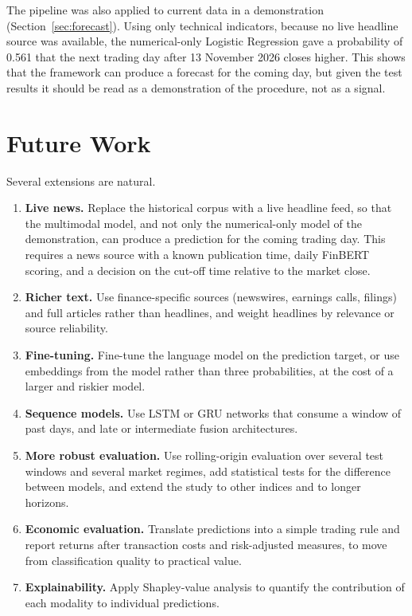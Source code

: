 The pipeline was also applied to current data in a demonstration (Section~\ref{sec:forecast}). Using only technical indicators, because no live headline source was available, the numerical-only Logistic Regression gave a probability of 0.561 that the next trading day after 13 November 2026 closes higher. This shows that the framework can produce a forecast for the coming day, but given the test results it should be read as a demonstration of the procedure, not as a signal.

\section{Future Work}
Several extensions are natural.
\begin{enumerate}
  \item \textbf{Live news.} Replace the historical corpus with a live headline feed, so that the multimodal model, and not only the numerical-only model of the demonstration, can produce a prediction for the coming trading day. This requires a news source with a known publication time, daily FinBERT scoring, and a decision on the cut-off time relative to the market close.
  \item \textbf{Richer text.} Use finance-specific sources (newswires, earnings calls, filings) and full articles rather than headlines, and weight headlines by relevance or source reliability.
  \item \textbf{Fine-tuning.} Fine-tune the language model on the prediction target, or use embeddings from the model rather than three probabilities, at the cost of a larger and riskier model.
  \item \textbf{Sequence models.} Use LSTM or GRU networks that consume a window of past days, and late or intermediate fusion architectures.
  \item \textbf{More robust evaluation.} Use rolling-origin evaluation over several test windows and several market regimes, add statistical tests for the difference between models, and extend the study to other indices and to longer horizons.
  \item \textbf{Economic evaluation.} Translate predictions into a simple trading rule and report returns after transaction costs and risk-adjusted measures, to move from classification quality to practical value.
  \item \textbf{Explainability.} Apply Shapley-value analysis to quantify the contribution of each modality to individual predictions.
\end{enumerate}
